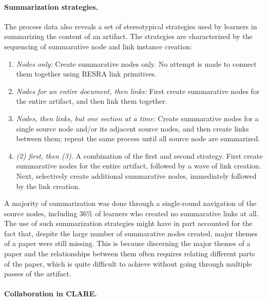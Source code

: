 \paragraph{Summarization strategies.}

The process data also reveals a set of stereotypical strategies used by
learners in summarizing the content of an artifact. The strategies are
characterized by the sequencing of summarative node and link instance
creation: 
   
\begin{enumerate}
\item {\it Nodes only:} Create summarative nodes only. No attempt is made
  to connect them together using RESRA link primitives.
  
\item {\it Nodes for an entire document, then links:} First create
  summarative nodes for the entire artifact, and then link them together.
  
\item {\it Nodes, then links, but one section at a time:} Create
  summarative nodes for a single source node and/or its adjacent source
  nodes, and then create links between them; repeat the same process until
  all source node are summarized.
  
\item {\sl (2) first, then (3).\/} A combination of the first and second
  strategy. First create summarative nodes for the entire artifact,
  followed by a wave of link creation. Next, selectively create additional
  summarative nodes, immediately followed by the link creation.
\end{enumerate}
  
A majority of summarization was done through a single-round navigation of
the source nodes, including 36\% of learners who created no summarative
links at all. The use of such summarization strategies might have in part
accounted for the fact that, despite the large number of summarative nodes
created, major themes of a paper were still missing. This is because
discerning the major themes of a paper and the relationships between them
often requires relating different parts of the paper, which is quite
difficult to achieve without going through multiple passes of the artifact.


\paragraph{Collaboration in CLARE.}

